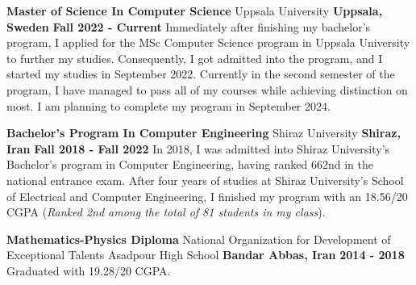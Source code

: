 

\begin{cventries}

  \cventry
    {\textbf{Master of Science In Computer Science}} %
    {Uppsala University} %
    {\textbf{Uppsala, Sweden}} %
    {\textbf{Fall 2022 - Current}} %
    {
        Immediately after finishing my bachelor’s program, I applied for the MSc Computer Science program in Uppsala University to further my studies. Consequently, I got admitted into the program, and I started my studies in September 2022. Currently in the second semester of the program, I have managed to pass all of my courses while achieving distinction on most. I am planning to complete my program in September 2024.
    }
    
  \cventry
    {\textbf{Bachelor’s Program In Computer Engineering}} %
    {Shiraz University} %
    {\textbf{Shiraz, Iran}} %
    {\textbf{Fall 2018 - Fall 2022}} %
    {
        In 2018, I was admitted into Shiraz University’s Bachelor’s program in Computer Engineering, having ranked 662nd in the national entrance exam. After four years of studies at Shiraz University’s School of Electrical and Computer Engineering, I finished my program with an 18.56/20 CGPA (\emph{Ranked 2nd among the total of 81 students in my class}).
    }
    
  \cventry
    {\textbf{Mathematics-Physics Diploma}} %
    {National Organization for Development of Exceptional Talents Asadpour High School} %
    {\textbf{Bandar Abbas, Iran}} %
    {\textbf{2014 - 2018}} %
    {
        Graduated with 19.28/20 CGPA.
    }
\end{cventries}
